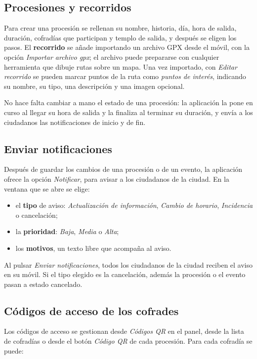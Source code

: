 \subsection{Procesiones y recorridos}

Para crear una procesión se rellenan su nombre, historia, día, hora de salida, duración, cofradías que participan y templo de salida, y después se eligen los pasos. El \textbf{recorrido} se añade importando un archivo GPX desde el móvil, con la opción \emph{Importar archivo gpx}; el archivo puede prepararse con cualquier herramienta que dibuje rutas sobre un mapa. Una vez importado, con \emph{Editar recorrido} se pueden marcar puntos de la ruta como \emph{puntos de interés}, indicando su nombre, su tipo, una descripción y una imagen opcional.

No hace falta cambiar a mano el estado de una procesión: la aplicación la pone en curso al llegar su hora de salida y la finaliza al terminar su duración, y envía a los ciudadanos las notificaciones de inicio y de fin.

\subsection{Enviar notificaciones}

Después de guardar los cambios de una procesión o de un evento, la aplicación ofrece la opción \emph{Notificar}, para avisar a los ciudadanos de la ciudad. En la ventana que se abre se elige:

\begin{itemize}
    \item el \textbf{tipo} de aviso: \emph{Actualización de información}, \emph{Cambio de horario}, \emph{Incidencia} o cancelación;
    \item la \textbf{prioridad}: \emph{Baja}, \emph{Media} o \emph{Alta};
    \item los \textbf{motivos}, un texto libre que acompaña al aviso.
\end{itemize}

Al pulsar \emph{Enviar notificaciones}, todos los ciudadanos de la ciudad reciben el aviso en su móvil. Si el tipo elegido es la cancelación, además la procesión o el evento pasan a estado cancelado.

\subsection{Códigos de acceso de los cofrades}

Los códigos de acceso se gestionan desde \emph{Códigos QR} en el panel, desde la lista de cofradías o desde el botón \emph{Código QR} de cada procesión. Para cada cofradía se puede:

